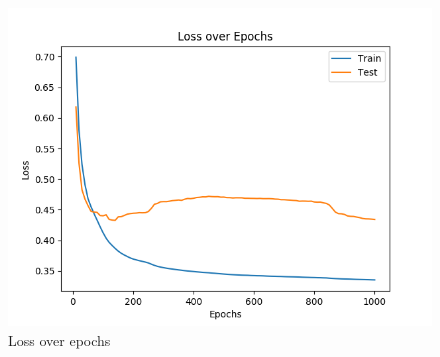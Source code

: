 \documentclass[11pt,a4paper]{article}
\begin{document}
\begin{figure}[hbtp]
\includegraphics[width=\columnwidth]{loss.png}
\caption{\label{fig:loss-graph} Loss over epochs}
\end{figure}
\end{document}
